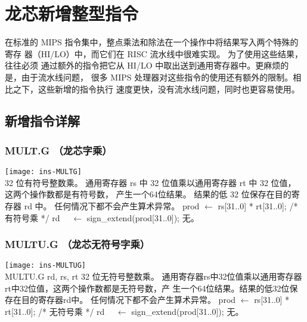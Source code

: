 \chapter{龙芯新增整型指令}

在标准的 MIPS 指令集中，整点乘法和除法在一个操作中将结果写入两个特殊的寄存
器（HI/LO）中，而它们在 RISC 流水线中很难实现。 为了使用这些结果，往往必须
通过额外的指令把它从 HI/LO 中取出送到通用寄存器中。更麻烦的是，由于流水线问题，
很多 MIPS 处理器对这些指令的使用还有额外的限制。相比之下，这些新增的指令执行
速度更快，没有流水线问题，同时也更容易使用。

\section{新增指令详解}

\subsection{MULT.G （龙芯字乘）}

\begin{instructionblk}
  \texttt{[image: ins-MULTG]} \\
  {32 位有符号整数乘。}
  {通用寄存器 rs 中 32 位值乘以通用寄存器 rt 中 32 位值，
  这两个操作数都是有符号数， 产生一个64位结果。 结果的低
  32 位保存在目的寄存器 rd 中。 \fldnewline
  任何情况下都不会产生算术异常。}
  {prod $\leftarrow$ rs[31..0] * rt[31..0]; /* 有符号乘 */ \newline
  rd~~ $\leftarrow$ sign\_extend(prod[31..0]);}
  {无。}
\end{instructionblk}

\subsection{MULTU.G （龙芯无符号字乘）}

\begin{instructionblk}
  \texttt{[image: ins-MULTUG]} \\
  \instructionbody
  {MULTU.G rd, rs, rt}
  {32 位无符号整数乘。}
  {通用寄存器rs中32位值乘以通用寄存器rt中32位值，这两个操作数都是无符号数，产
  生一个64位结果。结果的低32位保存在目的寄存器rd中。 \fldnewline
  任何情况下都不会产生算术异常。}
  {prod $\leftarrow$ rs[31..0] * rt[31..0]; /* 无符号乘 */ \newline
  rd~~ $\leftarrow$ sign\_extend(prod[31..0]);}
  {无。}
\end{instructionblk}

